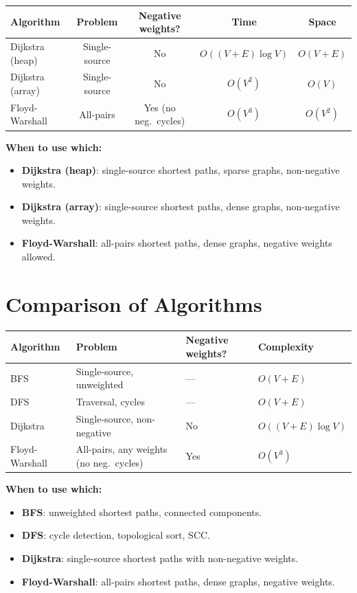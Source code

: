 \documentclass[11pt,a4paper]{article}
\begin{document}
\begin{center}
\renewcommand{\arraystretch}{1.2}
\small
\begin{tabular}{lcccc}
\toprule
Algorithm & Problem & Negative weights? & Time & Space \\
\midrule
Dijkstra (heap) & Single-source & No & $O((V + E) \log V)$ & $O(V + E)$ \\
Dijkstra (array) & Single-source & No & $O(V^2)$ & $O(V)$ \\
Floyd-Warshall & All-pairs & Yes (no neg.\ cycles) & $O(V^3)$ & $O(V^2)$ \\
\bottomrule
\end{tabular}
\end{center}

\textbf{When to use which:}
\begin{itemize}
    \item \textbf{Dijkstra (heap)}: single-source shortest paths, sparse graphs, non-negative weights.
    \item \textbf{Dijkstra (array)}: single-source shortest paths, dense graphs, non-negative weights.
    \item \textbf{Floyd-Warshall}: all-pairs shortest paths, dense graphs, negative weights allowed.
\end{itemize}

\section{Comparison of Algorithms}

\begin{center}
\renewcommand{\arraystretch}{1.3}
\small
\begin{tabular}{>{\raggedright\arraybackslash}p{3cm} >{\raggedright\arraybackslash}p{3cm} >{\raggedright\arraybackslash}p{3cm} >{\raggedright\arraybackslash}p{3cm}}
\toprule
Algorithm & Problem & Negative weights? & Complexity \\
\midrule
BFS & Single-source, unweighted & --- & $O(V + E)$ \\
DFS & Traversal, cycles & --- & $O(V + E)$ \\
Dijkstra & Single-source, non-negative & No & $O((V + E) \log V)$ \\
Floyd-Warshall & All-pairs, any weights (no neg.\ cycles) & Yes & $O(V^3)$ \\
\bottomrule
\end{tabular}
\end{center}

\textbf{When to use which:}
\begin{itemize}
    \item \textbf{BFS}: unweighted shortest paths, connected components.
    \item \textbf{DFS}: cycle detection, topological sort, SCC.
    \item \textbf{Dijkstra}: single-source shortest paths with non-negative weights.
    \item \textbf{Floyd-Warshall}: all-pairs shortest paths, dense graphs, negative weights.
\end{itemize}
\end{document}
